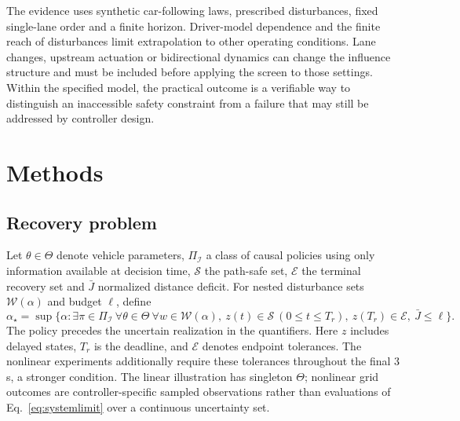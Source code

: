 \documentclass[12pt]{article}
\newcommand{\W}{\mathcal W}
\newcommand{\Erec}{\mathcal E}
\newcommand{\PI}{\Pi_{\mathcal I}}
\newcommand{\astar}{\alpha_\star}
\begin{document}
The evidence uses synthetic car-following laws, prescribed disturbances, fixed single-lane order and a finite horizon. Driver-model dependence and the finite reach of disturbances limit extrapolation to other operating conditions. Lane changes, upstream actuation or bidirectional dynamics can change the influence structure and must be included before applying the screen to those settings. Within the specified model, the practical outcome is a verifiable way to distinguish an inaccessible safety constraint from a failure that may still be addressed by controller design.

\section*{Methods}
\subsection*{Recovery problem}
Let $\theta\in\Theta$ denote vehicle parameters, $\PI$ a class of causal policies using only information available at decision time, $\mathcal S$ the path-safe set, $\Erec$ the terminal recovery set and $\bar J$ normalized distance deficit. For nested disturbance sets $\W(\alpha)$ and budget $\ell$, define
\begin{equation}
\astar=\sup\{\alpha:\exists\pi\in\PI\ \forall\theta\in\Theta\ \forall w\in\W(\alpha),\ z(t)\in\mathcal S\ (0\le t\le T_r),\ z(T_r)\in\Erec,\ \bar J\le\ell\}.
\label{eq:systemlimit}
\end{equation}
The policy precedes the uncertain realization in the quantifiers. Here $z$ includes delayed states, $T_r$ is the deadline, and $\Erec$ denotes endpoint tolerances. The nonlinear experiments additionally require these tolerances throughout the final 3 s, a stronger condition. The linear illustration has singleton $\Theta$; nonlinear grid outcomes are controller-specific sampled observations rather than evaluations of Eq.~\eqref{eq:systemlimit} over a continuous uncertainty set.
\end{document}
